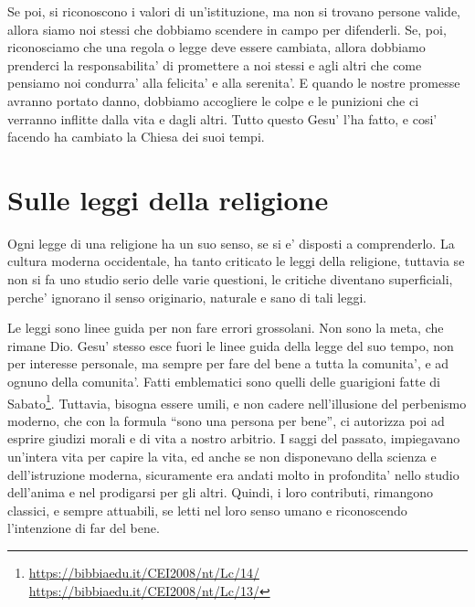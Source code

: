 Se poi, si riconoscono i valori di un'istituzione, ma non si trovano persone valide, allora siamo noi stessi che dobbiamo scendere in campo per difenderli. Se, poi, riconosciamo che una regola o legge deve essere cambiata, allora dobbiamo prenderci la responsabilita' di promettere a noi stessi e agli altri che come pensiamo noi condurra' alla felicita' e alla serenita'. E quando le nostre promesse avranno portato danno, dobbiamo accogliere le colpe e le punizioni che ci verranno inflitte dalla vita e dagli altri. Tutto questo Gesu' l'ha fatto, e cosi' facendo ha cambiato la Chiesa dei suoi tempi. 

\section{Sulle leggi della religione}

Ogni legge di una religione ha un suo senso, se si e' disposti a comprenderlo. La cultura moderna occidentale, ha tanto criticato le leggi della religione, tuttavia se non si fa uno studio serio delle varie questioni, le critiche diventano superficiali, perche' ignorano il senso originario, naturale e sano di tali leggi.

Le leggi sono linee guida per non fare errori grossolani. Non sono la meta, che rimane Dio. Gesu' stesso esce fuori le linee guida della legge del suo tempo, non per interesse personale, ma sempre per fare del bene a tutta la comunita', e ad ognuno della comunita'. Fatti emblematici sono quelli delle guarigioni fatte di Sabato\footnote{\url{https://bibbiaedu.it/CEI2008/nt/Lc/14/} \url{https://bibbiaedu.it/CEI2008/nt/Lc/13/}}. Tuttavia, bisogna essere umili, e non cadere nell'illusione del perbenismo moderno, che con la formula ``sono una persona per bene'', ci autorizza poi ad esprire giudizi morali e di vita a nostro arbitrio. I saggi del passato, impiegavano un'intera vita per capire la vita, ed anche se non disponevano della scienza e dell'istruzione moderna, sicuramente era andati molto in profondita' nello studio dell'anima e nel prodigarsi per gli altri. Quindi, i loro contributi, rimangono classici, e sempre attuabili, se letti nel loro senso umano e riconoscendo l'intenzione di far del bene.

